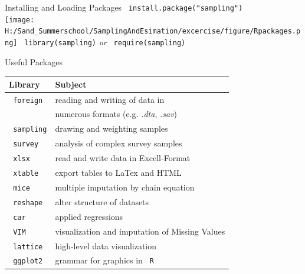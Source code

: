 \documentclass[11pt,german,hideothersubsections]{beamer}
\newcommand{\R}[1]{{\tt \color{blue}  #1}}
\begin{document}
\begin{frame}[fragile]{Installing and Loading Packages}
\R{install.package("sampling")}\\
\texttt{[image: H:/Sand\_Summerschool/SamplingAndEsimation/excercise/figure/Rpackages.png]}
\vspace{.25cm}
\R{library(sampling)} \emph{or} \R{require(sampling)}
\end{frame}
\begin{frame}[fragile]{Useful Packages}
\renewcommand{\arraystretch}{1}
\begin{tabular}{l|l}
Library & Subject\\
\hline
\R{foreign} & reading and writing of data in\\ 
& numerous formats (e.g. \emph{.dta}, \emph{.sav})\\
\R{sampling} & drawing and weighting samples\\
\R{survey} & analysis of complex survey samples\\
\R{xlsx} & read and write data in Excell-Format\\
\R{xtable} & export tables to LaTex and HTML\\
\R{mice} & multiple imputation by chain equation\\
\R{reshape} & alter structure of datasets\\
\R{car} & applied regressions\\
\R{VIM} & visualization and imputation of Missing Values\\
\R{lattice} & high-level data visualization\\
\R{ggplot2} & grammar for graphics in \R{R}\\
\end{tabular}
\end{frame}
\end{document}
